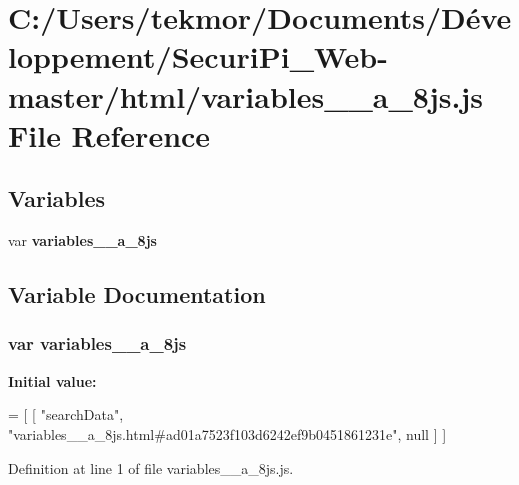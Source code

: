 \section{C\+:/\+Users/tekmor/\+Documents/\+Développement/\+Securi\+Pi\+\_\+\+Web-\/master/html/variables\+\_\+\+\_\+a\+\_\+8js.js File Reference}
\label{variables____a__8js_8js}
\subsection*{Variables}
\begin{DoxyCompactItemize}
\item 
var {\bf variables\+\_\+\+\_\+a\+\_\+8js}
\end{DoxyCompactItemize}


\subsection{Variable Documentation}
\subsubsection[{variables\+\_\+\+\_\+a\+\_\+8js}]{\setlength{\rightskip}{0pt plus 5cm}var variables\+\_\+\+\_\+a\+\_\+8js}\label{variables____a__8js_8js_a8b116a938ec4b2fa3b8abc6da6dad345}
{\bfseries Initial value\+:}
\begin{DoxyCode}
=
[
    [ \textcolor{stringliteral}{"searchData"}, \textcolor{stringliteral}{"variables\_\_a\_8js.html#ad01a7523f103d6242ef9b0451861231e"}, null ]
]
\end{DoxyCode}


Definition at line 1 of file variables\+\_\+\+\_\+a\+\_\+8js.\+js.

